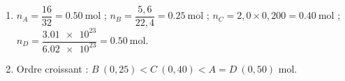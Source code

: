 \documentclass[11pt,a4paper]{article}
\begin{document}
\begin{corrige}
\begin{enumerate}[label=\alph*)]
  \item $n_A=\dfrac{16}{32}=\qty{0.50}{\mole}$ ; $n_B=\dfrac{5,6}{22,4}=\qty{0.25}{\mole}$ ;
        $n_C=2,0\times0,200=\qty{0.40}{\mole}$ ;
        $n_D=\dfrac{\num{3.01e23}}{\num{6.02e23}}=\qty{0.50}{\mole}.$
  \item Ordre croissant : $B\ (0,25) < C\ (0,40) < A = D\ (0,50)$ \si{\mole}.
\end{enumerate}
\end{corrige}
\end{document}
